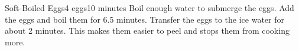 \documentclass[../Cookbook.tex]{subfiles}
\begin{document}
\begin{recipe}[SoftBoiledEggs]{Soft-Boiled Eggs}{4 eggs}{10 minutes}
	Boil enough water to submerge the eggs.
	Add the eggs and boil them for 6.5 minutes.
	Transfer the eggs to the ice water for about 2 minutes. This makes them easier to peel and stops them from cooking more.
\end{recipe}
\end{document}
